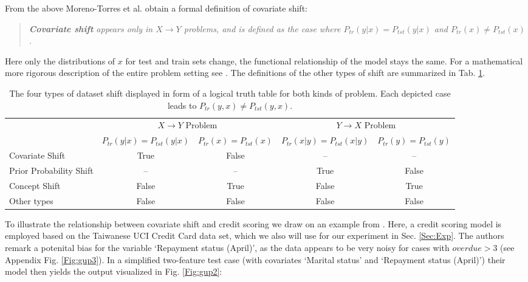 From the above Moreno-Torres et al. obtain a formal definition of covariate shift:
\begin{quote}{ \it
	\textbf{Covariate shift} appears only in $X \rightarrow Y$ problems, and is defined as the case where $P_{tr}(y|x) = P_{tst}(y|x)$  and $P_{tr}(x) \neq P_{tst}(x)$.}
\end{quote}
Here only the distributions of $x$ for test and train sets change, the functional relationship of the model stays the same. For a mathematical more rigorous description of the entire problem setting see \citep{sugiyama2012machine}. The definitions of the other types of shift are summarized in Tab. \ref{Tab:dataset_shift}. 

\begin{table}[ht]
	\begin{center}
		{\footnotesize
			\begin{tabular}{lcccc}
				\toprule
				\multicolumn{1}{c}{ } & \multicolumn{2}{c}{$X \rightarrow Y$ Problem} & \multicolumn{2}{c}{$Y \rightarrow X$ Problem } \\
				\cmidrule(l{3pt}r{3pt}){2-3} \cmidrule(l{3pt}r{3pt}){4-5} 
				& $P_{tr}(y|x) = P_{tst}(y|x)$ & $P_{tr}(x) = P_{tst}(x)$    & $P_{tr}(x|y) = P_{tst}(x|y)$     & $P_{tr}(y) = P_{tst}(y)$  \\
				\midrule
				Covariate Shift   & True & False & -- & --   \\
				Prior Probability Shift  & -- & -- & True & False \\
				Concept Shift & False & True & False & True\\
				Other types & False & False & False &False \\
				\bottomrule
		\end{tabular}}
	\end{center}
	\caption{The four types of dataset shift displayed in form of a logical truth table for both kinds of problem. Each depicted case leads to $P_{tr}(y,x) \neq P_{tst}(y,x)$.} 
	\label{Tab:dataset_shift}
\end{table}



To illustrate the relationship between covariate shift and credit scoring we draw on an example from \citep[Sec.~8.2]{wang2020deontological}. Here, a credit scoring model is employed based on the Taiwanese UCI Credit Card data set, which we also will use for our experiment in Sec. \ref{Sec:Exp}. The authors remark a potenital bias for the variable `Repayment status (April)', as the data appears to be very noisy for cases with $overdue > 3$ (see Appendix Fig. \ref{Fig:gup3}). In a simplified two-feature test case (with covariates `Marital status' and `Repayment status (April)') their model then yields the output visualized in Fig. \ref{Fig:gup2}:

